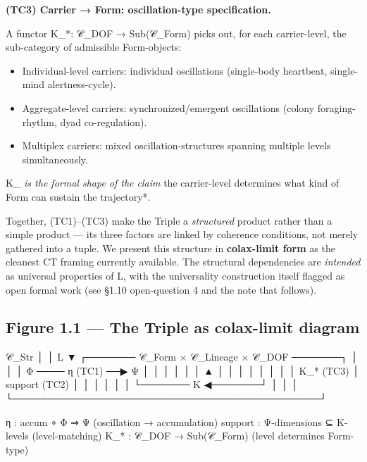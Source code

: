 \documentclass[11pt, openany]{book}
\begin{document}
\textbf{(TC3) Carrier → Form: oscillation-type specification.}

A functor Κ\_\allowbreak{}*: 𝒞\_\allowbreak{}DOF → Sub(𝒞\_\allowbreak{}Form) picks out, for each carrier-level, the sub-category of admissible Form-objects:

\begin{itemize}
\item Individual-level carriers: individual oscillations (single-body heartbeat, single-mind alertness-cycle).
\item Aggregate-level carriers: synchronized/emergent oscillations (colony foraging-rhythm, dyad co-regulation).
\item Multiplex carriers: mixed oscillation-structures spanning multiple levels simultaneously.
\end{itemize}

Κ\_\allowbreak{}\textit{ is the formal shape of the claim }the carrier-level determines what kind of Form can sustain the trajectory*.

Together, (TC1)–(TC3) make the Triple a \textit{structured} product rather than a simple product --- its three factors are linked by coherence conditions, not merely gathered into a tuple. We present this structure in \textbf{colax-limit form} as the cleanest CT framing currently available. The structural dependencies are \textit{intended} as universal properties of L, with the universality construction itself flagged as open formal work (see §1.10 open-question 4 and the note that follows).

\subsection{Figure 1.1 --- The Triple as colax-limit diagram}

\begin{Code}
                         𝒞_Str
                          │
                          │ L
                          ▼
       ┌─────── 𝒞_Form × 𝒞_Lineage × 𝒞_DOF ───────┐
       │                                            │
       │    Φ ──── η (TC1) ──▶ Ψ                    │
       │    │                  │                    │
       │    ▲                  │                    │
       │    │                  │                    │
       │    │ Κ_* (TC3)        │ support (TC2)      │
       │    │                  │                    │
       │    └─────── Κ ◀───────┘                    │
       │                                            │
       └────────────────────────────────────────────┘

η  : accum ∘ Φ ⇒ Ψ                    (oscillation → accumulation)
support : Ψ-dimensions ⊆ Κ-levels     (level-matching)
Κ_*  : 𝒞_DOF → Sub(𝒞_Form)             (level determines Form-type)
\end{Code}
\end{document}

